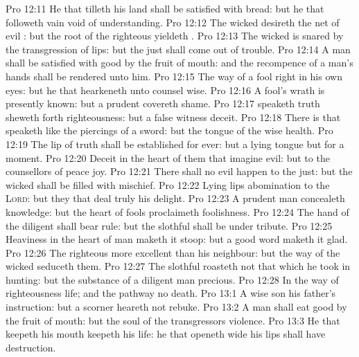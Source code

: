 \vs Pro 12:11 He that tilleth his land shall be satisfied with bread: but he that followeth vain  void of understanding.
\vs Pro 12:12 The wicked desireth the net of evil : but the root of the righteous yieldeth .
\vs Pro 12:13 The wicked is snared by the transgression of  lips: but the just shall come out of trouble.
\vs Pro 12:14 A man shall be satisfied with good by the fruit of  mouth: and the recompence of a man's hands shall be rendered unto him.
\vs Pro 12:15 The way of a fool  right in his own eyes: but he that hearkeneth unto counsel  wise.
\vs Pro 12:16 A fool's wrath is presently known: but a prudent  covereth shame.
\vs Pro 12:17  speaketh truth sheweth forth righteousness: but a false witness deceit.
\vs Pro 12:18 There is that speaketh like the piercings of a sword: but the tongue of the wise  health.
\vs Pro 12:19 The lip of truth shall be established for ever: but a lying tongue  but for a moment.
\vs Pro 12:20 Deceit  in the heart of them that imagine evil: but to the counsellors of peace  joy.
\vs Pro 12:21 There shall no evil happen to the just: but the wicked shall be filled with mischief.
\vs Pro 12:22 Lying lips  abomination to the \textsc{Lord}: but they that deal truly  his delight.
\vs Pro 12:23 A prudent man concealeth knowledge: but the heart of fools proclaimeth foolishness.
\vs Pro 12:24 The hand of the diligent shall bear rule: but the slothful shall be under tribute.
\vs Pro 12:25 Heaviness in the heart of man maketh it stoop: but a good word maketh it glad.
\vs Pro 12:26 The righteous  more excellent than his neighbour: but the way of the wicked seduceth them.
\vs Pro 12:27 The slothful  roasteth not that which he took in hunting: but the substance of a diligent man  precious.
\vs Pro 12:28 In the way of righteousness  life; and  the pathway  no death.
\vs Pro 13:1 A wise son  his father's instruction: but a scorner heareth not rebuke.
\vs Pro 13:2 A man shall eat good by the fruit of  mouth: but the soul of the transgressors  violence.
\vs Pro 13:3 He that keepeth his mouth keepeth his life:  he that openeth wide his lips shall have destruction.
